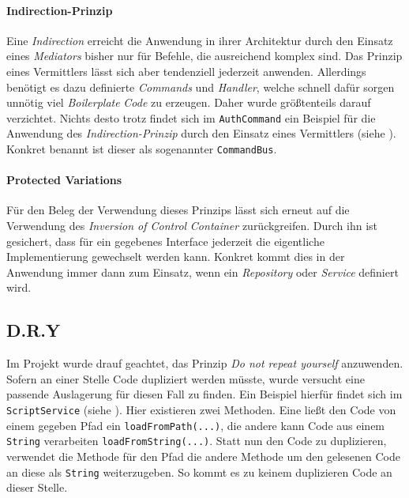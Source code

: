     \label{lst:module}
\egroup

\paragraph{Indirection-Prinzip}

Eine \emph{Indirection} erreicht die Anwendung in ihrer Architektur durch den Einsatz eines \emph{Mediators} bisher nur für Befehle, die ausreichend komplex sind.
Das Prinzip eines Vermittlers lässt sich aber tendenziell jederzeit anwenden.
Allerdings benötigt es dazu definierte \emph{Commands} und \emph{Handler}, welche schnell dafür sorgen unnötig viel \emph{Boilerplate} \emph{Code} zu erzeugen.
Daher wurde größtenteils darauf verzichtet.
Nichts desto trotz findet sich im \texttt{AuthCommand} ein Beispiel für die Anwendung des \emph{Indirection-Prinzip} durch den Einsatz eines Vermittlers (siehe ).
Konkret benannt ist dieser als sogenannter \texttt{CommandBus}.

\bgroup

    \label{lst:auth_command}
\egroup

\paragraph{Protected Variations}

Für den Beleg der Verwendung dieses Prinzips lässt sich erneut auf die Verwendung des \emph{Inversion of Control} \emph{Container} zurückgreifen.
Durch ihn ist gesichert, dass für ein gegebenes Interface jederzeit die eigentliche Implementierung gewechselt werden kann.
Konkret kommt dies in der Anwendung immer dann zum Einsatz, wenn ein \emph{Repository} oder \emph{Service} definiert wird.

\subsection{D.R.Y}
\label{subsec:dry}

Im Projekt wurde drauf geachtet, das Prinzip \emph{Do not repeat yourself} anzuwenden.
Sofern an einer Stelle Code dupliziert werden müsste, wurde versucht eine passende Auslagerung für diesen Fall zu finden.
Ein Beispiel hierfür findet sich im \texttt{ScriptService} (siehe ).
Hier existieren zwei Methoden.
Eine ließt den Code von einem gegeben Pfad ein \texttt{loadFromPath(...)}, die andere kann Code aus einem \texttt{String} verarbeiten \texttt{loadFromString(...)}.
Statt nun den Code zu duplizieren, verwendet die Methode für den Pfad die andere Methode um den gelesenen Code an diese als \texttt{String} weiterzugeben.
So kommt es zu keinem duplizieren Code an dieser Stelle.

